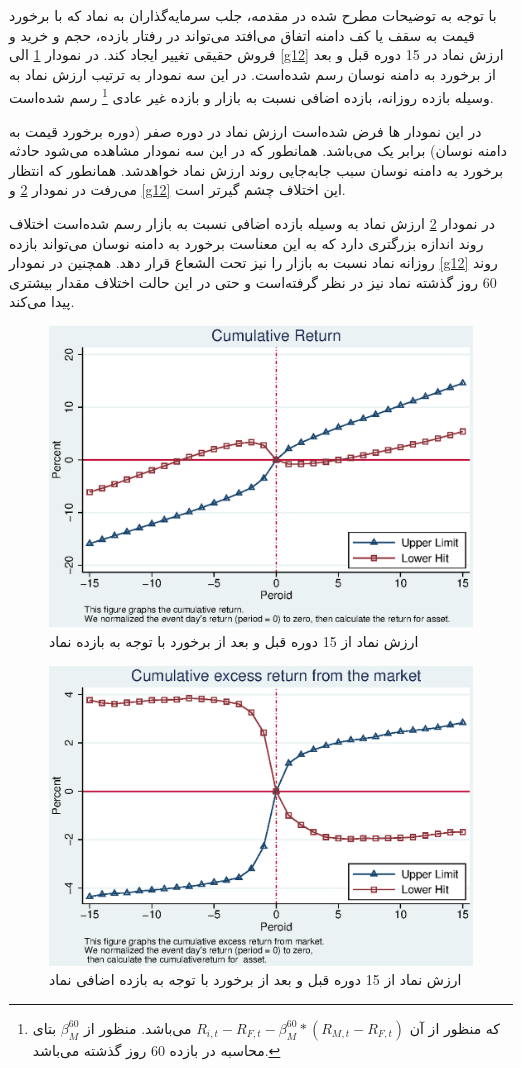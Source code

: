 \documentclass[12pt]{article}
\begin{document}
با توجه به توضیحات مطرح شده در مقدمه، جلب سرمایه‌گذاران به نماد که با برخورد قیمت به سقف یا کف دامنه اتفاق می‌افتد می‌تواند در رفتار بازده، حجم و خرید و فروش حقیقی تغییر ایجاد کند. در نمودار 
\ref{g4}
الی 
\ref{g12}
ارزش نماد در 15 دوره قبل و بعد از برخورد به دامنه نوسان رسم شده‌است. 
در این سه نمودار به ترتیب ارزش نماد به وسیله بازده روزانه، بازده اضافی نسبت به بازار  و بازده غیر عادی
\footnote{
 که منظور از آن 
$ R_{i,t} - R_{F,t} - \beta^{60}_M * (R_{M,t} - R_{F,t})$
می‌باشد. منظور از
$ \beta^{60}_M $
بتای محاسبه در بازده 60 روز گذشته می‌باشد. }
رسم شده‌است. 

در این نمودار ها فرض شده‌است ارزش نماد در دوره صفر (دوره برخورد قیمت به دامنه نوسان) برابر یک می‌باشد. همانطور که در این سه نمودار مشاهده می‌شود حادثه برخورد به دامنه نوسان سبب جا‌به‌جایی روند ارزش نماد خواهد‌شد. همانطور که انتظار می‌رفت در نمودار
\ref{g5}
و
\ref{g12}
این اختلاف چشم گیر‌تر است.

در نمودار 
\ref{g5}
 ارزش نماد به وسیله بازده اضافی نسبت به بازار رسم شده‌است اختلاف روند اندازه بزرگتری دارد که به این معناست برخورد به دامنه نوسان می‌تواند بازده روزانه نماد نسبت به بازار را نیز تحت الشعاع قرار دهد. 
 همچنین در نمودار 
 \ref{g12}
 روند 60 روز گذشته نماد نیز در نظر گرفته‌است و حتی در این حالت اختلاف مقدار بیشتری پیدا می‌کند.
 
\begin{figure}[htbp]
\centering
\includegraphics[width=0.8\columnwidth]{R.eps}
\caption{ارزش نماد از 15 دوره قبل  و بعد از برخورد  با توجه به بازده نماد }
\label{g4}
\end{figure}

\begin{figure}[htbp]
\centering
\includegraphics[width=0.8\columnwidth]{ER.eps}
\caption{ارزش نماد از 15 دوره قبل  و بعد از برخورد با توجه به بازده اضافی نماد }
\label{g5}
\end{figure}
\end{document}
